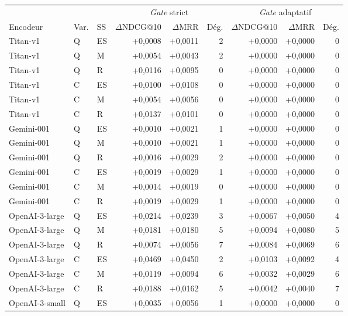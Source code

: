 \documentclass[a4paper,10pt]{article}
\begin{document}
\begin{table}[p]
\centering
\small
\begin{tabular}{lllrrrrrr}
\toprule
 & & & \multicolumn{3}{c}{\textit{Gate} strict} & \multicolumn{3}{c}{\textit{Gate} adaptatif} \\
\cmidrule(lr){4-6}\cmidrule(lr){7-9}
Encodeur & Var. & SS & $\Delta$NDCG@10 & $\Delta$MRR & Dég. & $\Delta$NDCG@10 & $\Delta$MRR & Dég. \\
\midrule
Titan-v1 & Q & ES & +0,0008 & +0,0011 & 2 & +0,0000 & +0,0000 & 0 \\
Titan-v1 & Q & M & +0,0054 & +0,0043 & 2 & +0,0000 & +0,0000 & 0 \\
Titan-v1 & Q & R & +0,0116 & +0,0095 & 0 & +0,0000 & +0,0000 & 0 \\
Titan-v1 & C & ES & +0,0100 & +0,0108 & 0 & +0,0000 & +0,0000 & 0 \\
Titan-v1 & C & M & +0,0054 & +0,0056 & 0 & +0,0000 & +0,0000 & 0 \\
Titan-v1 & C & R & +0,0137 & +0,0101 & 0 & +0,0000 & +0,0000 & 0 \\
\midrule
Gemini-001 & Q & ES & +0,0010 & +0,0021 & 1 & +0,0000 & +0,0000 & 0 \\
Gemini-001 & Q & M & +0,0010 & +0,0021 & 1 & +0,0000 & +0,0000 & 0 \\
Gemini-001 & Q & R & +0,0016 & +0,0029 & 2 & +0,0000 & +0,0000 & 0 \\
Gemini-001 & C & ES & +0,0019 & +0,0029 & 1 & +0,0000 & +0,0000 & 0 \\
Gemini-001 & C & M & +0,0014 & +0,0019 & 0 & +0,0000 & +0,0000 & 0 \\
Gemini-001 & C & R & +0,0019 & +0,0029 & 1 & +0,0000 & +0,0000 & 0 \\
\midrule
OpenAI-3-large & Q & ES & +0,0214 & +0,0239 & 3 & +0,0067 & +0,0050 & 4 \\
OpenAI-3-large & Q & M & +0,0181 & +0,0180 & 5 & +0,0094 & +0,0080 & 5 \\
OpenAI-3-large & Q & R & +0,0074 & +0,0056 & 7 & +0,0084 & +0,0069 & 6 \\
OpenAI-3-large & C & ES & +0,0469 & +0,0450 & 2 & +0,0103 & +0,0092 & 4 \\
OpenAI-3-large & C & M & +0,0119 & +0,0094 & 6 & +0,0032 & +0,0029 & 6 \\
OpenAI-3-large & C & R & +0,0188 & +0,0162 & 5 & +0,0042 & +0,0040 & 7 \\
\midrule
OpenAI-3-small & Q & ES & +0,0035 & +0,0056 & 1 & +0,0000 & +0,0000 & 0 \\

\end{tabular}
\end{table}
\end{document}
